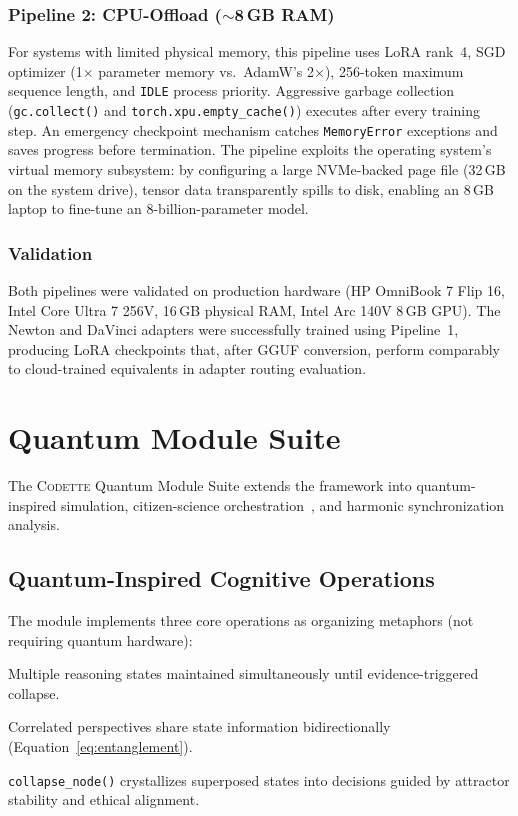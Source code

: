 \documentclass[11pt,a4paper]{article}
\newcommand{\codette}{\textsc{Codette}}
\begin{document}
\subsubsection{Pipeline 2: CPU-Offload (${\sim}$8\,GB RAM)}
For systems with limited physical memory, this pipeline uses LoRA rank~4, SGD optimizer (1$\times$ parameter memory vs.\ AdamW's 2$\times$), 256-token maximum sequence length, and \texttt{IDLE} process priority. Aggressive garbage collection (\texttt{gc.collect()} and \texttt{torch.xpu.empty\_cache()}) executes after every training step. An emergency checkpoint mechanism catches \texttt{MemoryError} exceptions and saves progress before termination. The pipeline exploits the operating system's virtual memory subsystem: by configuring a large NVMe-backed page file (32\,GB on the system drive), tensor data transparently spills to disk, enabling an 8\,GB laptop to fine-tune an 8-billion-parameter model.

\subsubsection{Validation}
Both pipelines were validated on production hardware (HP OmniBook 7 Flip 16, Intel Core Ultra 7 256V, 16\,GB physical RAM, Intel Arc 140V 8\,GB GPU). The Newton and DaVinci adapters were successfully trained using Pipeline~1, producing LoRA checkpoints that, after GGUF conversion, perform comparably to cloud-trained equivalents in adapter routing evaluation.

\section{Quantum Module Suite}
\label{sec:quantum}

The \codette{} Quantum Module Suite extends the framework into quantum-inspired simulation, citizen-science orchestration~\citep{harrison2025citizenscience}, and harmonic synchronization analysis.

\subsection{Quantum-Inspired Cognitive Operations}
The module implements three core operations as organizing metaphors (not requiring quantum hardware):
\begin{description}[leftmargin=*]
  \item[Superposition:] Multiple reasoning states maintained simultaneously until evidence-triggered collapse.
  \item[Entanglement:] Correlated perspectives share state information bidirectionally (Equation~\ref{eq:entanglement}).
  \item[Collapse:] \texttt{collapse\_node()} crystallizes superposed states into decisions guided by attractor stability and ethical alignment.
\end{description}
\end{document}
